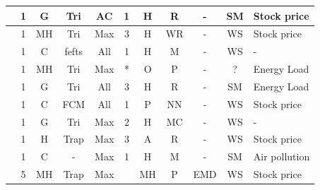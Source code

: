 \begin{center}
\begin{landscape}
\begin{longtable}[c]{|m{4cm}|c|c|c|c|c|c|c|c|c|m{5cm}|}
\cite{CarvalhoJr2017}      & 1                  & G                  & Tri  & AC              & 1              & H                       & R               & -                        & SM              & Stock price           \\ \hline
\cite{Jiang2017}           & 1                  & MH         & Tri  & Max                & 3              & H                       & WR      & -                        & WS            & Stock price           \\ \hline
\cite{Saberi2017}          & 1                  & C            & fefts       & All                    & 1              & H                       & M              & -                        & WS            & -                     \\ \hline
\cite{Sadaei2017}          & 1                  & MH         & Tri  & Max                & *              & O                         & P      & -                        & ?                        & Energy Load           \\ \hline
\cite{Severiano2017a}      & 1                  & G                  & Tri  & All                    & 3              & H                       & R               & -                        & SM              & Energy Load           \\ \hline
\cite{Bas2018}             & 1                  & C            & FCM         & All                    & 1              & P                             & NN               & -                        & WS            & Stock price           \\ \hline
\cite{Guney2018}           & 1                  & G                  & Tri  & Max                & 2              & H                       & MC        & -                        & WS            & -                     \\ \hline
\cite{Cheng2018}           & 1                  & H             & Trap & Max                & 3              & A                         & R                & -                        & WS            & Stock price           \\ \hline
\cite{Dincer2018}          & 1                  & C            & -           & Max                & 1              & H                       & M              & -                        & SM              & Air pollution         \\ \hline
\cite{Yang2018}            & 5                  & MH         & Trap & Max                &                & MH                   & P  & EMD                      & WS            & Stock price           \\ \hline

\end{longtable}
\end{landscape}
\end{center}
